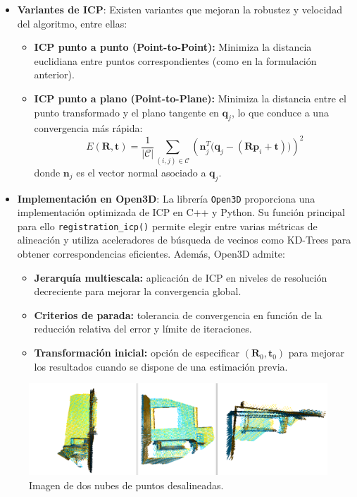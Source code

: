 \documentclass[12pt, a4paper, twoside]{article}
\begin{document}
\begin{itemize}
\begin{itemize}
    \item \textbf{Variantes de ICP}: Existen variantes que mejoran la robustez y velocidad del algoritmo, entre ellas:
    \begin{itemize}
      \item \textbf{ICP punto a punto (Point-to-Point):} Minimiza la distancia euclidiana entre puntos correspondientes (como en la formulación anterior).
      \item \textbf{ICP punto a plano (Point-to-Plane):} Minimiza la distancia entre el punto transformado y el plano tangente en $\mathbf{q}_j$, lo que conduce a una 
      convergencia más rápida:
      \[
      E(\mathbf{R}, \mathbf{t}) =
      \frac{1}{|\mathcal{C}|} \sum_{(i,j) \in \mathcal{C}}
      \left( \mathbf{n}_j^{T} \big(\mathbf{q}_j - (\mathbf{R}\mathbf{p}_i + \mathbf{t}) \big) \right)^{2}
      \]
      donde $\mathbf{n}_j$ es el vector normal asociado a $\mathbf{q}_j$.
    \end{itemize}
    \item \textbf{Implementación en Open3D\cite{Zhou2018}}: La librería \texttt{Open3D} proporciona una implementación optimizada de ICP en C++\cite{cpp} y Python\cite{python}. Su función principal para ello
    \texttt{registration\_icp()} permite elegir entre varias métricas de alineación y utiliza aceleradores de búsqueda de vecinos como KD-Trees para obtener correspondencias eficientes.
    Además, Open3D admite:
    \begin{itemize}
        \item \textbf{Jerarquía multiescala:} aplicación de ICP en niveles de resolución decreciente para mejorar la convergencia global.
        \item \textbf{Criterios de parada:} tolerancia de convergencia en función de la reducción relativa del error y límite de iteraciones.
        \item \textbf{Transformación inicial:} opción de especificar $(\mathbf{R}_0, \mathbf{t}_0)$ para mejorar los resultados cuando se dispone de una estimación previa.
    \end{itemize}
  \end{itemize}

  \begin{figure}[h]
    \centering
      \includegraphics[width=1\textwidth]{misaligned_frames.png}
    \caption{Imagen de dos nubes de puntos desalineadas.}
  \end{figure}


\end{itemize}
\end{document}
